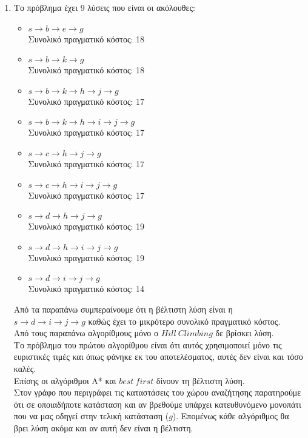 \documentclass[12pt]{article}
\begin{document}
\begin{itemize}[label=$\blacktriangleright$]
\begin{enumerate}
\begin{table}[H]
{\begin{tabular}{cccccc}
\end{tabular}%
}
\end{table}
\item Το πρόβλημα έχει 9 λύσεις που είναι οι ακόλουθες:
\begin{itemize}
\item $s\rightarrow b\rightarrow e\rightarrow g$\\
Συνολικό πραγματικό κόστος: 18
\item $s\rightarrow b\rightarrow k\rightarrow g$\\
Συνολικό πραγματικό κόστος: 18
\item $s\rightarrow b\rightarrow k\rightarrow h\rightarrow j\rightarrow g$\\
Συνολικό πραγματικό κόστος: 17
\item $s\rightarrow b\rightarrow k\rightarrow h\rightarrow i\rightarrow j\rightarrow g$\\
Συνολικό πραγματικό κόστος: 17
\item $s\rightarrow c\rightarrow h\rightarrow j\rightarrow g$\\
Συνολικό πραγματικό κόστος: 17
\item $s\rightarrow c\rightarrow h\rightarrow i\rightarrow j\rightarrow g$\\
Συνολικό πραγματικό κόστος: 17
\item $s\rightarrow d \rightarrow h\rightarrow j\rightarrow g$\\
Συνολικό πραγματικό κόστος: 19
\item $s\rightarrow d \rightarrow h\rightarrow i\rightarrow j\rightarrow g$\\
Συνολικό πραγματικό κόστος: 19
\item $s\rightarrow d \rightarrow i\rightarrow j \rightarrow g$\\
Συνολικό πραγματικό κόστος: 14
\end{itemize}
Από τα παραπάνω συμπεραίνουμε ότι η βέλτιστη λύση είναι η $s\rightarrow d \rightarrow i\rightarrow j \rightarrow g$ καθώς έχει το μικρότερο συνολικό πραγματικό κόστος.\\
Από τους παραπάνω αλγορίθμους μόνο ο $Hill \ Climbing$ δε βρίσκει λύση.\\
Το πρόβλημα του πρώτου αλγορίθμου είναι ότι αυτός χρησιμοποιεί μόνο τις ευριστικές τιμές και όπως φάνηκε εκ του αποτελέσματος, αυτές δεν είναι και τόσο καλές.\\
Επίσης οι αλγόριθμοι Α* και $best \ first$ δίνουν τη βέλτιστη λύση.\\
Στον γράφο που περιγράφει τις καταστάσεις του χώρου αναζήτησης παρατηρούμε ότι σε οποιαδήποτε κατάσταση και αν βρεθούμε υπάρχει κατευθυνόμενο μονοπάτι που να μας οδηγεί στην τελική κατάσταση ($g$). Επομένως κάθε αλγόριθμος θα βρει λύση ακόμα και αν αυτή δεν είναι η βέλτιστη.

\end{enumerate}
\end{itemize}
\end{document}
